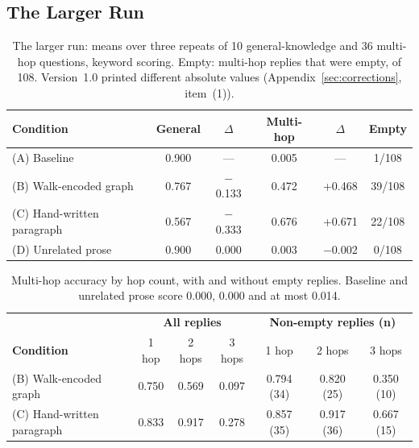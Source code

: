 \documentclass[11pt,a4paper]{article}
\begin{document}
\subsection{The Larger Run}
\label{sec:larger}

\begin{table}[!htbp]
\centering
\begin{tabular}{lccccc}
\toprule
\textbf{Condition} & \textbf{General} & \textbf{$\Delta$} & \textbf{Multi-hop} & \textbf{$\Delta$} & \textbf{Empty} \\
\midrule
(A) Baseline & 0.900 & --- & 0.005 & --- & 1/108 \\
(B) Walk-encoded graph & 0.767 & $-$0.133 & 0.472 & +0.468 & 39/108 \\
(C) Hand-written paragraph & 0.567 & $-$0.333 & 0.676 & +0.671 & 22/108 \\
(D) Unrelated prose & 0.900 & 0.000 & 0.003 & $-$0.002 & 0/108 \\
\bottomrule
\end{tabular}
\caption{The larger run: means over three repeats of 10 general-knowledge and 36 multi-hop questions, keyword scoring. Empty: multi-hop replies that were empty, of 108. Version~1.0 printed different absolute values (Appendix~\ref{sec:corrections}, item~(1)).}
\label{tab:larger}
\end{table}

\begin{table}[!htbp]
\centering
\begin{tabular}{lcccccc}
\toprule
& \multicolumn{3}{c}{\textbf{All replies}} & \multicolumn{3}{c}{\textbf{Non-empty replies (n)}} \\
\textbf{Condition} & 1 hop & 2 hops & 3 hops & 1 hop & 2 hops & 3 hops \\
\midrule
(B) Walk-encoded graph & 0.750 & 0.569 & 0.097 & 0.794 (34) & 0.820 (25) & 0.350 (10) \\
(C) Hand-written paragraph & 0.833 & 0.917 & 0.278 & 0.857 (35) & 0.917 (36) & 0.667 (15) \\
\bottomrule
\end{tabular}
\caption{Multi-hop accuracy by hop count, with and without empty replies. Baseline and unrelated prose score 0.000, 0.000 and at most 0.014.}
\label{tab:hops}
\end{table}
\end{document}
